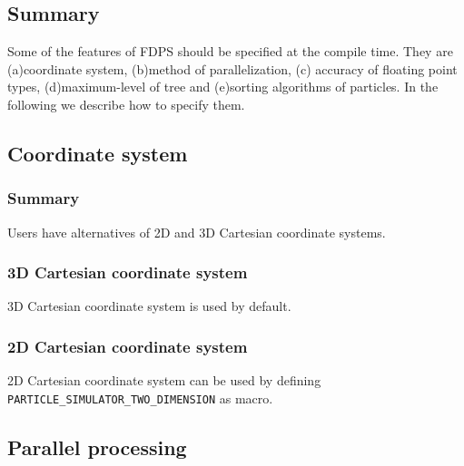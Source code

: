 \subsection{Summary}

Some of the features of FDPS should be specified at the compile time.
They are (a)coordinate system, (b)method of parallelization, (c)
accuracy of floating point types, (d)maximum-level of tree and
(e)sorting algorithms of particles. In the following we describe how
to specify them.



\subsection{Coordinate system}
\label{sec:compile_coordinate}

\subsubsection{Summary}

Users have alternatives of 2D and 3D Cartesian coordinate systems.

\subsubsection{3D Cartesian coordinate system}

3D Cartesian coordinate system is used by default.

\subsubsection{2D Cartesian coordinate system}

2D Cartesian coordinate system can be used by defining
\texttt{PARTICLE\_SIMULATOR\_TWO\_DIMENSION} as macro.

\subsection{Parallel processing}

